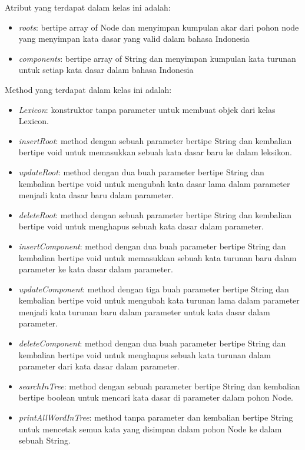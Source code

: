 Atribut yang terdapat dalam kelas ini adalah:

\begin{itemize}
	\item \textit{roots}: bertipe array of Node dan menyimpan kumpulan akar dari pohon node yang menyimpan kata dasar yang valid dalam bahasa Indonesia
	\item \textit{components}: bertipe array of String dan menyimpan kumpulan kata turunan untuk setiap kata dasar dalam bahasa Indonesia
\end{itemize}

Method yang terdapat dalam kelas ini adalah:

\begin{itemize}
	\item \textit{Lexicon}: konstruktor tanpa parameter untuk membuat objek dari kelas Lexicon.
	\item \textit{insertRoot}: method dengan sebuah parameter bertipe String dan kembalian bertipe void untuk memasukkan sebuah kata dasar baru ke dalam leksikon.
	\item \textit{updateRoot}: method dengan dua buah parameter bertipe String dan kembalian bertipe void untuk mengubah kata dasar lama dalam parameter menjadi kata dasar baru dalam parameter.
	\item \textit{deleteRoot}: method dengan sebuah parameter bertipe String dan kembalian bertipe void untuk menghapus sebuah kata dasar dalam parameter.
	\item \textit{insertComponent}: method dengan dua buah parameter bertipe String dan kembalian bertipe void untuk memasukkan sebuah kata turunan baru dalam parameter ke kata dasar dalam parameter.
	\item \textit{updateComponent}: method dengan tiga buah parameter bertipe String dan kembalian bertipe void untuk mengubah kata turunan lama dalam parameter menjadi kata turunan baru dalam parameter untuk kata dasar dalam parameter.
	\item \textit{deleteComponent}: method dengan dua buah parameter bertipe String dan kembalian bertipe void untuk menghapus sebuah kata turunan dalam parameter dari kata dasar dalam parameter.
	\item \textit{searchInTree}: method dengan sebuah parameter bertipe String dan kembalian bertipe boolean untuk mencari kata dasar di parameter dalam pohon Node.
	\item \textit{printAllWordInTree}: method tanpa parameter dan kembalian bertipe String untuk mencetak semua kata yang disimpan dalam pohon Node ke dalam sebuah String.
\end{itemize}

